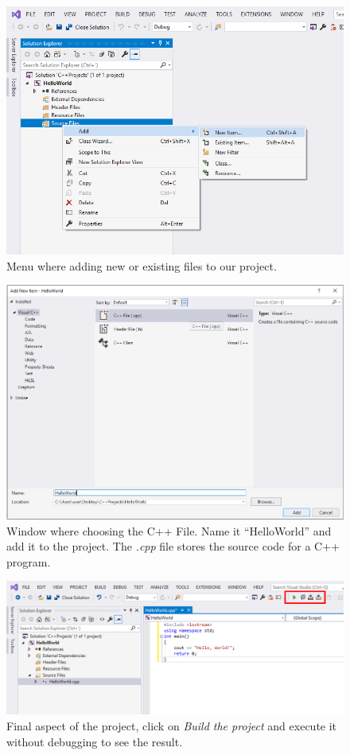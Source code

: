 \begin{figure}
    \centering
    \includegraphics[width= \textwidth]{Figures/C++3}
    \caption{Menu where adding new or existing files to our project.}
    \label{fig:C++3}
\end{figure}

\begin{figure}
    \centering
    \includegraphics[width= \textwidth]{Figures/C++4}
    \caption{Window where choosing the C++ File. Name it ``HelloWorld'' and add it to the project. The \textit{.cpp} file stores the source code for a C++ program.}
    \label{fig:C++4}
\end{figure}    
 
\begin{figure}
    \centering
    \includegraphics[width= \textwidth]{Figures/C++5}
    \caption{Final aspect of the project, click on \textit{Build the project} and execute it without debugging to see the result.}
    \label{fig:C++5}
\end{figure}    
 
